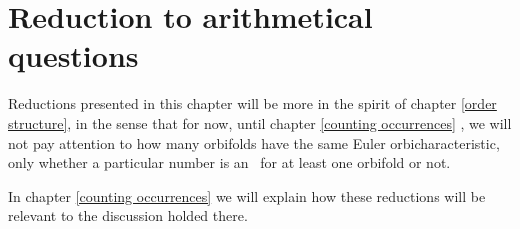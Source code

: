 \chapter{Reduction to arithmetical questions}\label{reduction_to_arithmetical}
Reductions presented in this chapter will be more in the spirit of chapter \ref{order structure}, 
in the sense that 
for now, until chapter \ref{counting occurrences} 
, we will not pay attention 
to how many orbifolds have the same Euler orbicharacteristic, only whether a particular 
number is an \Eoc\ for at least one orbifold or not. 

In chapter \ref{counting occurrences} we will explain how these reductions will be relevant 
to the discussion holded there. 


